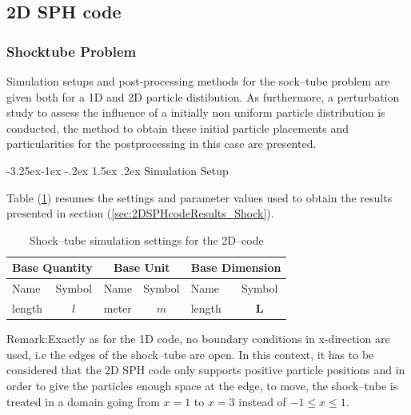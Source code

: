\documentclass{report}
\makeatletter
\renewcommand\paragraph{\@startsection{paragraph}{4}{\z@}%
  {-3.25ex\@plus -1ex \@minus -.2ex}%
  {1.5ex \@plus .2ex}%
  {\normalfont\normalsize\bfseries}}
\makeatother
\begin{document}


\subsection{2D SPH code}

\subsubsection{Shocktube Problem}
\label{sec:2Dshock_simuSetup&Co}
Simulation setups and post-processing methods for the sock--tube problem are given both for a 1D and 2D particle distibution. As furthermore, a perturbation study to assess the influence of a initially non uniform particle distribution is conducted, the method to obtain these initial particle placements and particularities for the postprocessing in this case are presented. 

\paragraph{Simulation Setup}

Table (\ref{tab:SimuSettings_Shock}) resumes the settings and parameter values used to obtain the results presented in section (\ref{sec:2DSPHcodeResults_Shock}). 



\begin{table}[h] %
\label{tab:SimuSettings_Shock}
\centering

\begin{tabular}[c]{|l c|l c|l c|} %
\hline
\hline
\multicolumn{2}{|c|}{\textbf{Base Quantity}} & \multicolumn{2}{|c|}{\textbf{Base Unit}} & \multicolumn{2}{|c|}{\textbf{Base Dimension}}\\
\hline
Name & Symbol & Name & Symbol & Name & Symbol\\
\hline
\hline
length & $l$ & meter & $m$ & length & {\bf L}\\

\hline
\hline
\end{tabular}
\caption[]{Shock--tube simulation settings for the 2D--code}

\end{table}
Remark:Exactly as for the 1D code, no boundary conditions in x-direction are used, i.e the edges of the shock--tube are open. In this context, it has to be considered that the 2D SPH code only supports positive particle positions and in order to give the particles enough space at the edge, to move, the shock--tube is treated in a domain going from $x=1$ to $x=3$ instead of $-1\leq x\leq1$. 
\end{document}
